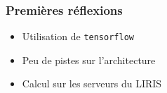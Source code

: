 \begin{frame}
	\frametitle{Premières réflexions}
	\begin{itemize}
		\setlength{\itemsep}{1.2\baselineskip}
		\item Utilisation de \texttt{tensorflow}
		\item Peu de pistes sur l'architecture
		\item Calcul sur les serveurs du LIRIS
	\end{itemize}
\end{frame}